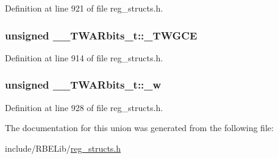 Definition at line 921 of file reg\+\_\+structs.\+h.

\hypertarget{union_____t_w_a_rbits__t_a0f95198aeabe1a4ec6b1d1cc79a081aa}{
\subsubsection[{\+\_\+\+T\+W\+G\+C\+E}]{\setlength{\rightskip}{0pt plus 5cm}unsigned \+\_\+\+\_\+\+T\+W\+A\+Rbits\+\_\+t\+::\+\_\+\+T\+W\+G\+C\+E}}\label{union_____t_w_a_rbits__t_a0f95198aeabe1a4ec6b1d1cc79a081aa}


Definition at line 914 of file reg\+\_\+structs.\+h.

\hypertarget{union_____t_w_a_rbits__t_a39ec7154eb77d712384d4f10d58489c8}{
\subsubsection[{\+\_\+w}]{\setlength{\rightskip}{0pt plus 5cm}unsigned \+\_\+\+\_\+\+T\+W\+A\+Rbits\+\_\+t\+::\+\_\+w}}\label{union_____t_w_a_rbits__t_a39ec7154eb77d712384d4f10d58489c8}


Definition at line 928 of file reg\+\_\+structs.\+h.



The documentation for this union was generated from the following file\+:\begin{DoxyCompactItemize}
\item 
include/\+R\+B\+E\+Lib/\hyperlink{reg__structs_8h}{reg\+\_\+structs.\+h}\end{DoxyCompactItemize}
